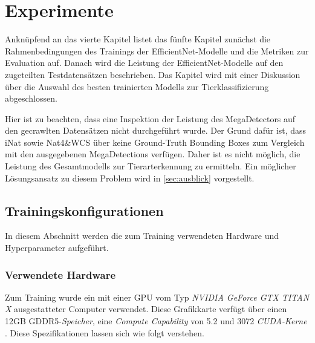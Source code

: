 \chapter{Experimente} \label{chap:experimentresult}

Anknüpfend an das vierte Kapitel listet das fünfte Kapitel zunächst die Rahmenbedingungen des Trainings der EfficientNet-Modelle und die Metriken zur Evaluation auf. Danach wird die Leistung der EfficientNet-Modelle auf den zugeteilten Testdatensätzen beschrieben. Das Kapitel wird mit einer Diskussion über die Auswahl des besten trainierten Modells zur Tierklassifizierung abgeschlossen.

Hier ist zu beachten, dass eine Inspektion der Leistung des MegaDetectors auf den gecrawlten Datensätzen nicht durchgeführt wurde. Der Grund dafür ist, dass iNat sowie Nat4\&WCS über keine Ground-Truth Bounding Boxes zum Vergleich mit den ausgegebenen MegaDetections verfügen. Daher ist es nicht möglich, die Leistung des Gesamtmodells zur Tierarterkennung zu ermitteln. Ein möglicher Lösungsansatz zu diesem Problem wird in \autoref{sec:ausblick} vorgestellt.

\section{Trainingskonfigurationen}

In diesem Abschnitt werden die zum Training verwendeten Hardware und Hyperparameter aufgeführt.

\subsection{Verwendete Hardware}

Zum Training wurde ein mit einer GPU vom Typ \emph{NVIDIA GeForce GTX TITAN X} ausgestatteter Computer verwendet. Diese Grafikkarte verfügt über einen 12GB GDDR5-\emph{Speicher}, eine \emph{Compute Capability} von 5.2 und 3072 \emph{CUDA-Kerne} \cite{gtxtitanx}. Diese Spezifikationen lassen sich wie folgt verstehen.

